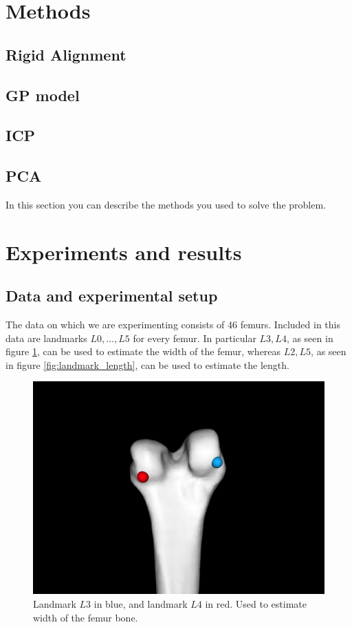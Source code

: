 \documentclass[10pt]{article}
\begin{document}
\section{Methods}
\subsection{Rigid Alignment}
\subsection{GP model}
\subsection{ICP}
\subsection{PCA}


In this section you can describe the methods you used to solve the problem.

\newpage
\section{Experiments and results}
\subsection{Data and experimental setup}


The data on which we are experimenting consists of 46 femurs. Included in this data are landmarks $L0,\dots,L5$ for every femur.
In particular $L3,L4$, as seen in figure \ref{fig:landmark_width}, can be used to estimate the width of the femur, whereas $L2,L5$, as seen in figure \ref{fig:landmark_length}, can be used to estimate the length.

\begin{figure}[h]
\centering
\includegraphics[scale=0.2]{screenshots/L3blue_L4red_width.png}
\caption{Landmark $L3$ in blue, and landmark $L4$ in red. Used to estimate width of the femur bone.}
\label{fig:landmark_width}
\end{figure}
\end{document}
